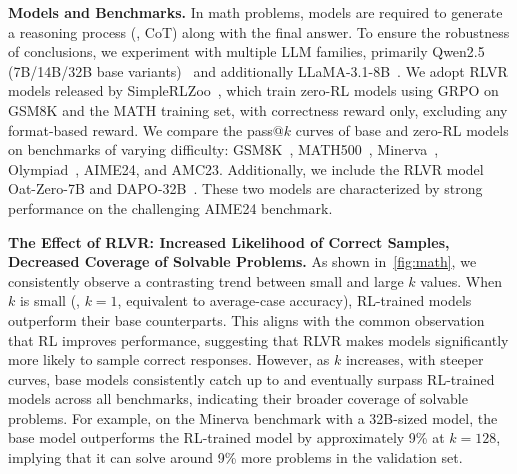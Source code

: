\textbf{Models and Benchmarks.}
In math problems, models are required to generate a reasoning process (\ie, CoT) along with the final answer.
To ensure the robustness of conclusions, we experiment with multiple LLM families, primarily Qwen2.5 (7B/14B/32B base variants)~\cite{yang2024qwen25} and additionally LLaMA-3.1-8B~\cite{grattafiori2024llama3}.
We adopt RLVR models released by SimpleRLZoo~\cite{zeng2025simplerl}, which train zero-RL models using GRPO on GSM8K and the MATH training set, with correctness reward only, excluding any format-based reward.
We compare the pass@$k$ curves of base and zero-RL models on benchmarks of varying difficulty:
GSM8K~\cite{cobbe2021gsm8k}, MATH500~\cite{hendrycks2021math500}, Minerva~\cite{lewkowycz2022minerva}, Olympiad~\cite{he2024olympiadbench}, AIME24, and AMC23. 
Additionally, we include the RLVR model Oat-Zero-7B and DAPO-32B~\cite{liu2025oat, yu2025dapo}.
These two models are characterized by strong performance on the challenging AIME24 benchmark.



\textbf{The Effect of RLVR: Increased Likelihood of Correct Samples, Decreased Coverage of Solvable Problems.}  
As shown in~\cref{fig:math}, we consistently observe a contrasting trend between small and large $k$ values.  
When $k$ is small (\eg, $k = 1$, equivalent to average-case accuracy), RL-trained models outperform their base counterparts. This aligns with the common observation that RL improves performance, suggesting that RLVR makes models significantly more likely to sample correct responses.
However, as $k$ increases, with steeper curves, base models consistently catch up to and eventually surpass RL-trained models across all benchmarks, indicating their broader coverage of solvable problems.
For example, on the Minerva benchmark with a 32B-sized model, the base model outperforms the RL-trained model by approximately 9\% at $k = 128$, implying that it can solve around 9\% more problems in the validation set.  

